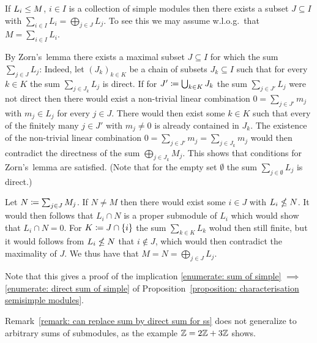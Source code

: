 \begin{remark}
  \label{remark: can replace sum by direct sum for ss}
  If $L_i \leq M$, $i \in I$ is a collection of simple modules then there exists a subset $J \subseteq I$ with $\sum_{i \in I} L_i = \bigoplus_{j \in J} L_j$.
  To see this we may assume w.l.o.g.\ that $M = \sum_{i \in I} L_i$.
  
  By Zorn’s~lemma there exists a maximal subset $J \subseteq I$ for which the sum $\sum_{j \in J} L_j$:
  Indeed, let $(J_k)_{k \in K}$ be a chain of subsets $J_k \subseteq I$ such that for every $k \in K$ the sum $\sum_{j \in J_k} L_j$ is direct.
  If for $J' \coloneqq \bigcup_{k \in K} J_k$ the sum $\sum_{j \in J'} L_j$ were not direct then there would exist a non-trivial linear combination $0 = \sum_{j \in J'} m_j$ with $m_j \in L_j$ for every $j \in J$.
  There would then exist some $k \in K$ such that every of the finitely many $j \in J'$ with $m_j \neq 0$ is already contained in $J_k$.
  The existence of the non-trivial linear combination $0 = \sum_{j \in J'} m_j = \sum_{j \in J_k} m_j$ would then contradict the directness of the sum $\bigoplus_{j \in J_k} M_j$.
  This shows that conditions for Zorn’s~lemma are satisfied.
  (Note that for the empty set $\emptyset$ the sum $\sum_{j \in \emptyset} L_j$ is direct.)
  
  Let $N \coloneqq \sum_{j \in J} M_j$.
  If $N \neq M$ then there would exist some $i \in J$ with $L_i \nleq N$.
  It would then follows that $L_i \cap N$ is a proper submodule of $L_i$ which would show that $L_i \cap N = 0$.
  For $K \coloneqq J \cap \{i\}$ the sum $\sum_{k \in K} L_k$ wolud then still finite, but it would follows from $L_i \nleq N$ that $i \notin J$, which would then contradict the maximality of $J$.
  We thus have that $M = N = \bigoplus_{j \in J} L_j$.
  
  Note that this gives a proof of the implication \ref*{enumerate: sum of simple} $\implies$ \ref*{enumerate: direct sum of simple} of Proposition~\ref{proposition: characterisation semisimple modules}.
\end{remark}


\begin{warning}
  Remark~\ref{remark: can replace sum by direct sum for ss} does not generalize to arbitrary sums of submodules, as the example $\mathbb{Z} = 2\mathbb{Z} + 3\mathbb{Z}$ shows.
\end{warning}


